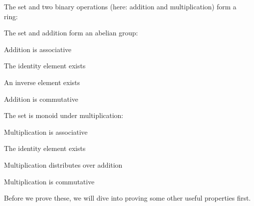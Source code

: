 \begin{compactitem}
  \item The set and two binary operations (here: addition and multiplication) form a ring:
  \begin{compactitem}
    \item The set and addition form an abelian group:
    \begin{compactitem}
    \item Addition is associative
    \item The identity element exists
    \item An inverse element exists
    \item Addition is commutative
    \end{compactitem}
  \item The set is monoid under multiplication:
    \begin{compactitem}
    \item Multiplication is associative
    \item The identity element exists
    \end{compactitem}
  \item Multiplication distributes over addition
  \end{compactitem}
  \item Multiplication is commutative
\end{compactitem}
Before we prove these, we will dive into proving some other useful properties first.
